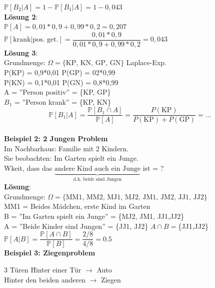 $\mathds{P}[B_2 \vert A] = 1- \mathds{P}[B_1 \vert A ] = 1-0,043$\medskip\\
\textbf{Lösung 2}:\\ 
$\mathds{P}[A] = 0,01*0,9+0,99*0,2 = 0,207$\\
$\mathds{P}[\text{krank}\vert \text{pos. get.}]= \dfrac{0,01*0,9}{0,01*0,9+0,99*0,2} = 0,043$\medskip\\
\textbf{Lösung 3}:\\ 
Grundmenge: $\Omega = \{\text{KP, KN, GP, GN}\}$ \hspace{1cm} Laplace-Exp.\\
P(KP) = 0,9*0,01 \hspace{2cm} P(GP) = 02*0,99\\
P(KN) = 0,1*0,01 \hspace{2cm} P(GN) = 0,8*0,99\smallskip\\
A = ''Person positiv'' = \{KP, GP\}\\
$B_1$ = ''Person krank'' =  \{KP, KN\} 
$$\mathds{P}[B_1\vert A] = \dfrac{\mathds{P}[B_1 \cap A]}{\mathds{P}[A]} = \dfrac{P(\text{KP})}{P(\text{KP})+P(\text{GP})} = ...$$\medskip\\
\textbf{Beispiel 2: 2 Jungen Problem}\\
Im Nachbarhaus: Familie mit 2 Kindern.\\
Sie beobachten: Im Garten spielt ein Junge.\\
Wkeit, dass das $\underbrace{\text{andere Kind auch ein Junge}}_\text{d.h. beide sind Jungen}$ ist = ?\smallskip\\
\textbf{Lösung}:\\
Grundmenge: $\Omega = \{\text{MM1, MM2, MJ1, MJ2, JM1, JM2, JJ1, JJ2}\}$\\
MM1 = Beides Mädchen, erste Kind im Garten\smallskip\\
B = ''Im Garten spielt ein Junge'' = \{MJ2, JM1, JJ1,JJ2\}\\
A = ''Beide Kinder sind Jungen'' = \{JJ1, JJ2\} \hspace{1cm} $A\cap B = $\{JJ1,JJ2\}\medskip\\
$\mathds{P}[A\vert B] = \dfrac{\mathds{P}[A \cap B]}{\mathds{P}[B]} = \dfrac{2/8}{4/8} = 0.5$\bigskip\\
\textbf{Beispiel 3: Ziegenproblem}
\begin{tabbing}
	3 Türen \hspace{1cm} \= Hinter einer Tür $\rightarrow$ Auto\\
	\> Hinter den beiden anderen $\rightarrow$ Ziegen
\end{tabbing}
